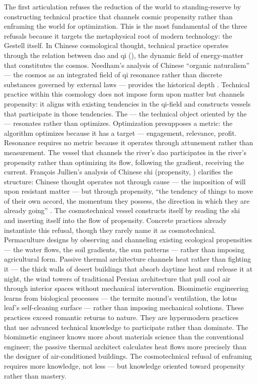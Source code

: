 The first articulation refuses the reduction of the world to standing-reserve by constructing technical practice that channels cosmic propensity rather than enframing the world for optimization. This is the most fundamental of the three refusals because it targets the metaphysical root of modern technology: the Gestell itself. In Chinese cosmological thought, technical practice operates through the relation between dao and qi (), the dynamic field of energy-matter that constitutes the cosmos. Needham’s analysis of Chinese “organic naturalism” — the cosmos as an integrated field of qi resonance rather than discrete substances governed by external laws — provides the historical depth \cite{needham_1956}. Technical practice within this cosmology does not impose form upon matter but channels propensity: it aligns with existing tendencies in the qi-field and constructs vessels that participate in those tendencies. The    — the technical object oriented by the  — resonates rather than optimizes. Optimization presupposes a metric: the algorithm optimizes because it has a target — engagement, relevance, profit. Resonance requires no metric because it operates through attunement rather than measurement. The vessel that channels the river’s dao participates in the river’s propensity rather than optimizing its flow, following the gradient, receiving the current. François Jullien’s analysis of Chinese shi (propensity,  ) clarifies the structure: Chinese thought operates not through cause — the imposition of will upon resistant matter — but through propensity, “the tendency of things to move of their own accord, the momentum they possess, the direction in which they are already going” \cite[pp.~26--48]{jullien_1995}. The cosmotechnical vessel constructs itself by reading the shi and inserting itself into the flow of propensity. Concrete practices already instantiate this refusal, though they rarely name it as cosmotechnical. Permaculture designs by observing and channeling existing ecological propensities — the water flows, the soil gradients, the sun patterns — rather than imposing agricultural form. Passive thermal architecture channels heat rather than fighting it — the thick walls of desert buildings that absorb daytime heat and release it at night, the wind towers of traditional Persian architecture that pull cool air through interior spaces without mechanical intervention. Biomimetic engineering learns from biological processes — the termite mound’s ventilation, the lotus leaf’s self-cleaning surface — rather than imposing mechanical solutions. These practices exceed romantic returns to nature. They are hypermodern practices that use advanced technical knowledge to participate rather than dominate. The biomimetic engineer knows more about materials science than the conventional engineer; the passive thermal architect calculates heat flows more precisely than the designer of air-conditioned buildings. The cosmotechnical refusal of enframing requires more knowledge, not less — but knowledge oriented toward propensity rather than mastery.

